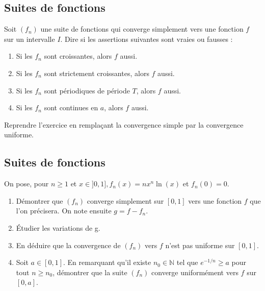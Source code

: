 \subsection{Suites de fonctions}
Soit $\left(f_n\right)$ une suite de fonctions qui converge simplement vers une fonction $f$ sur un intervalle $I$. Dire si les assertions suivantes sont vraies ou fausses :
\begin{enumerate}[label = \alph*)]
  \item Si les $f_n$ sont croissantes, alors $f$ aussi.
  \item Si les $f_n$ sont strictement croissantes, alors $f$ aussi.
  \item Si les $f_n$ sont périodiques de période $T$, alors $f$ aussi.
  \item Si les $f_n$ sont continues en $a$, alors $f$ aussi.
\end{enumerate}

Reprendre l'exercice en remplaçant la convergence simple par la convergence uniforme.

\vspace{1em}

\subsection{Suites de fonctions}
On pose, pour $n \geq 1$ et $x \in] 0,1], f_n(x)=n x^n \ln (x)$ et $f_n(0)=0$.
\begin{enumerate}[label = \alph*)]
  \item Démontrer que $\left(f_n\right)$ converge simplement sur $[0,1]$ vers une fonction $f$ que l'on précisera. On note ensuite $g=f-f_n$.
  \item Étudier les variations de g.
  \item En déduire que la convergence de $\left(f_n\right)$ vers $f$ n'est pas uniforme sur $[0,1]$.
  \item Soit $a \in[0,1]$. En remarquant qu'il existe $n_0 \in \mathbb{N}$ tel que $e^{-1 / n} \geq a$ pour tout $n \geq n_0$, démontrer que la suite $\left(f_n\right)$ converge uniformément vers $f$ sur $[0, a]$.
\end{enumerate}